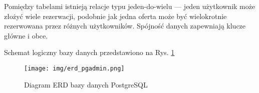Pomiędzy tabelami istnieją relacje typu jeden-do-wielu — jeden użytkownik może złożyć wiele rezerwacji, podobnie jak jedna oferta może być wielokrotnie rezerwowana przez różnych użytkowników. Spójność danych zapewniają klucze główne i obce.

Schemat logiczny bazy danych przedstawiono na Rys. \ref{fig:erd_pgadmin}

\begin{figure}[H]
    \centering
    \texttt{[image: img/erd\_pgadmin.png]}
    \caption{Diagram ERD bazy danych PostgreSQL}
    \label{fig:erd_pgadmin}
\end{figure}